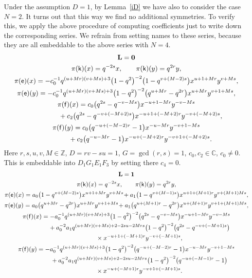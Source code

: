 \documentclass[10pt,a4paper]{amsart}
\numberwithin{equation}{section}
\begin{document}
Under the assumption $D=1$, by Lemma~\ref{iD} we have also to consider the case $N=2$. It turns out that this way we find no additional symmetries. To verify this, we apply the above procedure of computing coefficients just to write down the corresponding series. We refrain from setting names to these series, because they are all embeddable to the above series with $N=4$.
\begin{gather*}
\mathbf{L}=\mathbf{0}\\
\pi(\mathsf{k})(x)= q^{-2s}x ,\qquad\pi(\mathsf{k})(y)=q^{2r}y,\\
\pi(\mathsf{e})(x)= -c_0^{-1}q^{(u+Mr)(v+Ms)+3}\big(1-q^2\big)^{-2}\big(1-q^{v+(M-2)s}\big)x^{u+1+Mr}y^{v+Ms},\\
\pi(\mathsf{e})(y)= -c_0^{-1}q^{(u+Mr)(v+Ms)+3}\big(1-q^2\big)^{-2}\big(q^{u+Mr}-q^{2r}\big)x^{u+Mr}y^{v+1+Ms},\\
\pi(\mathsf{f})(x)= c_0\big(q^{2s}-q^{-v-Ms}\big)x^{-u+1-Mr}y^{-v-Ms}\\
\hphantom{\pi(\mathsf{f})(x)=}{} + c_2\big(q^{2s}-q^{-v+(-M+2)s}\big)x^{-u+1+(-M+2)r}y^{-v+(-M+2)s},\\
\pi(\mathsf{f})(y)= c_0\big(q^{-u+(-M-2)r}-1\big)x^{-u-Mr}y^{-v+1-Ms}\\
\hphantom{\pi(\mathsf{f})(y)=}{}+ c_2\big(q^{-u-Mr}-1\big)x^{-u+(-M+2)r}y^{-v+1+(-M+2)s}.
\end{gather*}
Here $r,s,u,v,M\in\mathbb{Z}$, $D=rv-su=1$, $G=\operatorname{gcd}(r,s)=1$, $c_0,c_2\in\mathbb{C}$, $c_0\ne 0$. This is embeddable into $D_1G_1E_1F_3$ by setting there $c_4=0$.
\begin{gather*}
 \mathbf{L}=\mathbf{1}\\
 \pi(\mathsf{k})(x)= q^{-2s}x ,\qquad\pi(\mathsf{k})(y)=q^{2r}y ,\\
\pi(\mathsf{e})(x)= a_0\big(1-q^{v+(M-2)s}\big)x^{u+1+Mr}y^{v+Ms}\!+ a_1\big(1-q^{v+(M-1)s}\big)x^{u+1+(M+1)r}y^{v+(M+1)Ms} ,\\
\pi(\mathsf{e})(y)= a_0\big(q^{u+Mr}-q^{2r}\big)x^{u+Mr}y^{v+1+Ms}\!+ a_1\big(q^{u+(M+1)r}-q^{2r}\big)x^{u+(M+1)r}y^{v+1+(M+1)Ms} ,\\
\pi(\mathsf{f})(x)= -a_0^{-1}q^{(u+Mr)(v+Ms)+3}\big(1-q^2\big)^{-2}\big(q^{2s}-q^{-v-Ms}\big)x^{-u+1-Mr}y^{-v-Ms}\\
\hphantom{\pi(\mathsf{f})(x)=}{}+ a_0^{-2}a_1q^{(u+Mr)(v+Ms)+2-2su-2Mrs}\big(1-q^2\big)^{-2}\big(q^{2s}-q^{-v+(-M+1)s}\big)\\
\hphantom{\pi(\mathsf{f})(x)=}{}\times x^{-u+1+(-M+1)r}y^{-v+(-M+1)s} ,\\
\pi(\mathsf{f})(y)= -a_0^{-1}q^{(u+Mr)(v+Ms)+3}\big(1-q^2\big)^{-2}\big(q^{-u+(-M-2)r}-1\big)x^{-u-Mr}y^{-v+1-Ms}\\
\hphantom{\pi(\mathsf{f})(y)=}{}+ a_0^{-2}a_1q^{(u+Mr)(v+Ms)+2-2su-2Mrs}\big(1-q^2\big)^{-2}\big(q^{-u+(-M-1)r}-1\big)\\
\hphantom{\pi(\mathsf{f})(y)=}{}\times x^{-u+(-M+1)r}y^{-v+1+(-M+1)s}.
\end{gather*}
\end{document}
